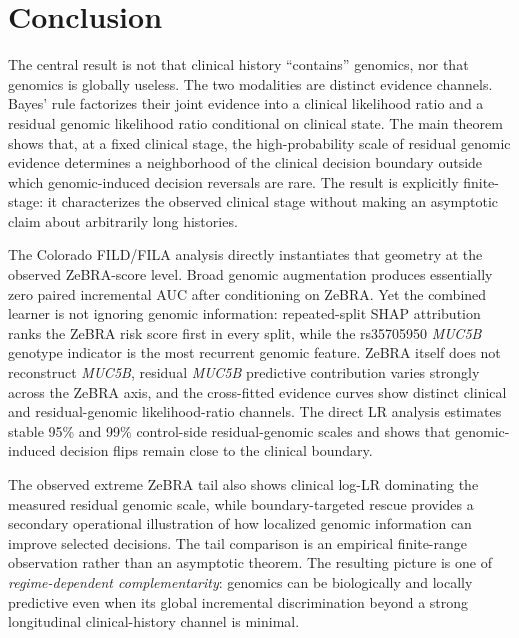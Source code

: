 \section{Conclusion}

The central result is not that clinical history ``contains'' genomics, nor that genomics is globally useless. The two modalities are distinct evidence channels. Bayes' rule factorizes their joint evidence into a clinical likelihood ratio and a residual genomic likelihood ratio conditional on clinical state. The main theorem shows that, at a fixed clinical stage, the high-probability scale of residual genomic evidence determines a neighborhood of the clinical decision boundary outside which genomic-induced decision reversals are rare. The result is explicitly finite-stage: it characterizes the observed clinical stage without making an asymptotic claim about arbitrarily long histories.

The Colorado FILD/FILA analysis directly instantiates that geometry at the observed ZeBRA-score level. Broad genomic augmentation produces essentially zero paired incremental AUC after conditioning on ZeBRA. Yet the combined learner is not ignoring genomic information: repeated-split SHAP attribution ranks the ZeBRA risk score first in every split, while the rs35705950 \textit{MUC5B} genotype indicator is the most recurrent genomic feature. ZeBRA itself does not reconstruct \textit{MUC5B}, residual \textit{MUC5B} predictive contribution varies strongly across the ZeBRA axis, and the cross-fitted evidence curves show distinct clinical and residual-genomic likelihood-ratio channels. The direct LR analysis estimates stable 95\% and 99\% control-side residual-genomic scales and shows that genomic-induced decision flips remain close to the clinical boundary.

The observed extreme ZeBRA tail also shows clinical log-LR dominating the measured residual genomic scale, while boundary-targeted rescue provides a secondary operational illustration of how localized genomic information can improve selected decisions. The tail comparison is an empirical finite-range observation rather than an asymptotic theorem. The resulting picture is one of \emph{regime-dependent complementarity}: genomics can be biologically and locally predictive even when its global incremental discrimination beyond a strong longitudinal clinical-history channel is minimal.




\clearpage



